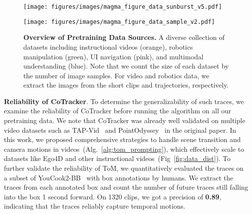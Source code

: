 \begin{figure*}[!t]
    \centering
    \begin{minipage}{0.29\textwidth}
        \centering
        \texttt{[image: figures/images/magma\_figure\_data\_sunburst\_v5.pdf]} 
    \end{minipage}
    \hfill
    \begin{minipage}{0.7\textwidth}
        \centering
        \texttt{[image: figures/images/magma\_figure\_data\_sample\_v2.pdf]}
    \end{minipage}
    \caption{\textbf{Overview of Pretraining Data Sources.} A diverse collection of datasets including instructional videos (\textcolor[RGB]{242,150,75}{orange}), robotics manipulation (\textcolor[RGB]{102,188,156}{green}), UI navigation (\textcolor[RGB]{235,150,170}{pink}), and multimodal understanding (\textcolor[RGB]{70,130,180}{blue}). Note that we count the size of each dataset by the number of image samples. For video and robotics data, we extract the images from the short clips and trajectories, respectively.}
    \label{fig:dataset_vis}
\end{figure*}

\noindent\textbf{Reliability of CoTracker}. To determine the generalizability of such traces, we examine the reliability of CoTracker before running the algorithm on all our pretraining data. We note that CoTracker was already well validated on multiple video datasets such as TAP-Vid~\cite{doersch2022tap} and PointOdyssey~\cite{zheng2023pointodyssey} in the original paper. In this work, we proposed comprehensive strategies to handle scene transition and camera motions in videos~(Alg.~\ref{alg:tom_prompting}), which effectively scale to datasets like Ego4D and other instructional videos~(Fig~\ref{fig:data_dist}). To further validate the reliability of ToM, we quantitatively evaluated the traces on a subset of YouCook2-BB~\cite{ZhLoCoBMVC18} with box annotations by humans. We extract the traces from each annotated box and count the number of future traces still falling into the box 1 second forward. On 1320 clips, we got a precision of \textbf{0.89}, indicating that the traces reliably capture temporal motions. 


